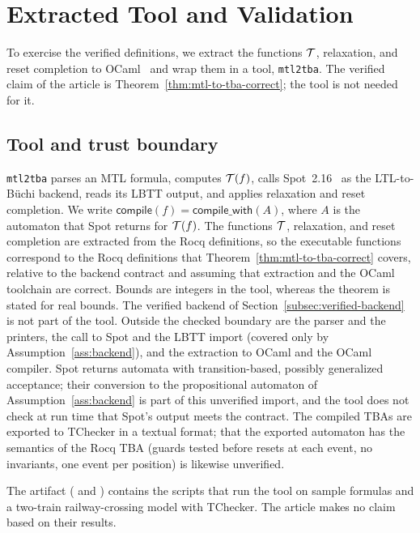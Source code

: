 \section{Extracted Tool and Validation}
\label{sec:evaluation}
To exercise the verified definitions, we extract the functions $\mathcal{T}$,
relaxation, and reset completion to OCaml~\cite{letouzey_extraction} and wrap
them in a tool, \texttt{mtl2tba}. The verified claim of the article is Theorem~\ref{thm:mtl-to-tba-correct}; the
tool is not needed for it.

\subsection{Tool and trust boundary}
\label{subsec:workflow}
\texttt{mtl2tba} parses an MTL formula, computes $\mathcal{T}(f)$, calls
Spot~2.16~\cite{spot} as the LTL-to-B\"uchi backend, reads its LBTT output, and
applies relaxation and reset completion. We write
$\mathsf{compile}(f)=\mathsf{compile\_with}(A)$, where $A$ is the automaton that
Spot returns for $\mathcal{T}(f)$. The functions $\mathcal{T}$, relaxation, and reset completion
are extracted from the Rocq definitions, so the executable functions correspond to the Rocq definitions that
Theorem~\ref{thm:mtl-to-tba-correct} covers, relative to the backend contract
and assuming that extraction and the OCaml toolchain are correct. Bounds are
integers in the tool, whereas the theorem is stated for real bounds. The verified backend of Section~\ref{subsec:verified-backend} is not
part of the tool. Outside the checked boundary are the parser and the printers, the call
to Spot and the LBTT import (covered only by Assumption~\ref{ass:backend}), and the extraction to OCaml and the OCaml compiler. Spot returns
automata with transition-based, possibly generalized acceptance; their
conversion to the propositional automaton of Assumption~\ref{ass:backend} is
part of this unverified import, and the tool does not check at run time that
Spot's output meets the contract. The compiled TBAs are exported to TChecker in
a textual format; that the exported automaton has the semantics of the Rocq
TBA (guards tested before resets at each event, no invariants, one event per
position) is likewise unverified.

The artifact ( and ) contains the scripts
that run the tool on sample formulas and a two-train railway-crossing model with
TChecker. The article makes no claim based on their results.
